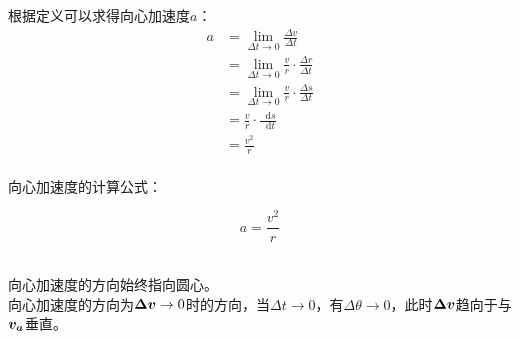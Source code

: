 \documentclass[UTF8]{ctexart}
\newcommand*{\veb}[1]{\vb*{#1}}
\newcommand*{\dif}{\mathop{}\!\mathrm{d}}
\begin{document}
    根据定义可以求得向心加速度$a$：
    \begin{align}
        a
        &=\lim_{\Delta t\rightarrow 0}\frac{\Delta v}{\Delta t}\\[3mm]
        &=\lim_{\Delta t\rightarrow 0}\frac{v}{r}\cdot\frac{\Delta r}{\Delta t}\\[3mm]
        &=\lim_{\Delta t\rightarrow 0}\frac{v}{r}\cdot\frac{\Delta s}{\Delta t}\\[3mm]
        &=\frac{v}{r}\cdot\frac{\dif s}{\dif t}\\[3mm]
        &=\frac{v^2}{r}
    \end{align}\\
    向心加速度的计算公式：
    \begin{large}
        \begin{equation*}
            a=\frac{v^2}{r}    
        \end{equation*}
    \end{large}\\
    向心加速度的方向始终指向圆心。\\[3mm]
    向心加速度的方向为$\veb{\Delta v}\rightarrow 0$时的方向，当$\Delta t\rightarrow 0$，有$\Delta\theta\rightarrow 0$，此时$\veb{\Delta v}$趋向于与$\veb{v_a}$垂直。

\newpage
\end{document}
